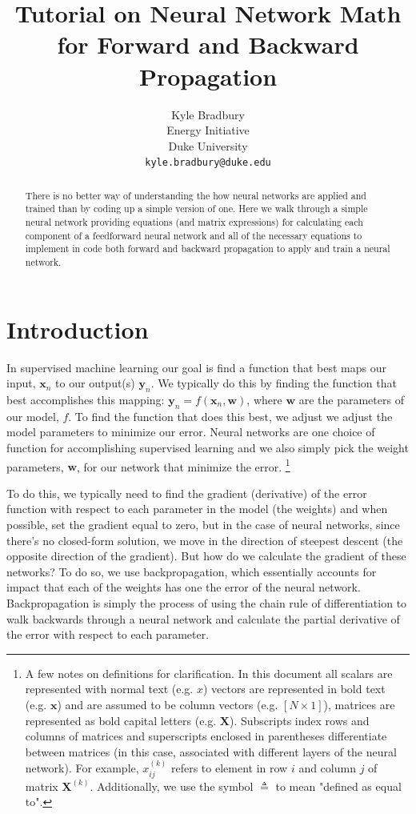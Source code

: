 \documentclass{article}
\title{Tutorial on Neural Network Math for Forward and Backward Propagation}
\author{
  Kyle Bradbury \\
  Energy Initiative\\
  Duke University\\
  \texttt{kyle.bradbury@duke.edu} \\
}
\begin{document}
\maketitle

\begin{abstract}
There is no better way of understanding the how neural networks are applied and trained than by coding up a simple version of one. Here we walk through a simple neural network providing equations (and matrix expressions) for calculating each component of a feedforward neural network and all of the necessary equations to implement in code both forward and backward propagation to apply and train a neural network.
\end{abstract}



\section{Introduction}

In supervised machine learning our goal is find a function that best maps our input, $\mathbf{x}_n$ to our output(s) $\mathbf{y}_n$. We typically do this by finding the function that best accomplishes this mapping: $\mathbf{y}_n = f(\mathbf{x}_n, \mathbf{w})$, where $\mathbf{w}$ are the parameters of our model, $f$. To find the function that does this best, we adjust we adjust the model parameters to minimize our error. Neural networks are one choice of function for accomplishing supervised learning and we also simply pick the weight parameters, $\mathbf{w}$, for our network that minimize the error. \footnote{A few notes on definitions for clarification. In this document all scalars are represented with normal text (e.g. $x$) vectors are represented in bold text (e.g. $\mathbf{x}$) and are assumed to be column vectors (e.g. $[N \times 1]$), matrices are represented as bold capital letters (e.g. $\mathbf{X}$). Subscripts index rows and columns of matrices and superscripts enclosed in parentheses differentiate between matrices (in this case, associated with different layers of the neural network). For example, $x_{ij}^{(k)}$ refers to element in row $i$ and column $j$ of matrix $\mathbf{X}^{(k)}$. Additionally, we use the symbol $\triangleq$ to mean "defined as equal to".}

To do this, we typically need to find the gradient (derivative) of the error function with respect to each parameter in the model (the weights) and when possible, set the gradient equal to zero, but in the case of neural networks, since there's no closed-form solution, we move in the direction of steepest descent (the opposite direction of the gradient). But how do we calculate the gradient of these networks? To do so, we use backpropagation, which essentially accounts for impact that each of the weights has one the error of the neural network. Backpropagation is simply the process of using the chain rule of differentiation to walk backwards through a neural network and calculate the partial derivative of the error with respect to each parameter.
\end{document}

